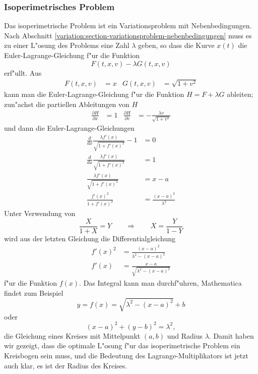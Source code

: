 \subsubsection{Isoperimetrisches Problem}
Das isoperimetrische Problem ist ein Variationsproblem mit
Nebenbedingungen.
Nach Abschnitt 
\ref{variation:section-variationsproblem-nebenbedingungen}
muss es zu einer L"osung des Problems eine Zahl $\lambda$
geben, so dass die Kurve $x(t)$ die Euler-Lagrange-Gleichung f"ur die Funktion
\[
F(t,x,v)-\lambda G(t,x,v)
\]
erf"ullt. Aus
\begin{align*}
F(t,x,v) &= x&
G(t,x,v) &= \sqrt{1+v^2}
\end{align*}
kann man die Euler-Lagrange-Gleichung f"ur die Funktion $H=F+\lambda G$
ableiten; zun"achst die partiellen Ableitungen von $H$
\begin{align*}
\frac{\partial H}{\partial x}&=1
&
\frac{\partial H}{\partial v}&=-\frac{\lambda v}{\sqrt{1+v^2}}
\end{align*}
und dann die Euler-Lagrange-Gleichungen
\begin{align*}
\frac{d}{dx} \frac{\lambda f'(x)}{\sqrt{1+f'(x)^2}}-1&=0
\\
\frac{d}{dx} \frac{\lambda f'(x)}{\sqrt{1+f'(x)^2}}&=1
\\
\frac{\lambda f'(x)}{\sqrt{1+f'(x)^2}}&=x - a
\\
\frac{f'(x)^2}{1+f'(x)^2}&=\frac{(x-a)^2}{\lambda^2}
\end{align*}
Unter Verwendung von
\[
\frac{X}{1+X}=Y
\qquad
\Rightarrow
\qquad
X=\frac{Y}{1-Y}
\]
wird aus der letzten Gleichung die Differentialgleichung
\begin{align*}
f'(x)^2&=\frac{(x-a)^2}{\lambda^2-(x-a)^2}
\\
f'(x)&=\frac{x-a}{\sqrt{\lambda^2-(x-a)^2}}
\end{align*}
f"ur die Funktion $f(x)$. Das Integral kann man durchf"uhren, 
Mathematica findet zum Beispiel
\[
y=f(x)=\sqrt{\lambda^2 - (x-a)^2}+b
\]
oder
\[
(x-a)^2+(y-b)^2=\lambda^2,
\]
die Gleichung eines Kreises mit Mittelpunkt $(a,b)$ und Radius
$\lambda$.
Damit haben wir gezeigt, dass die optimale L"osung f"ur das
isoperimetrische Problem ein Kreisbogen sein muss, und die
Bedeutung des Lagrange-Multiplikators ist jetzt auch klar, es
ist der Radius des Kreises.


